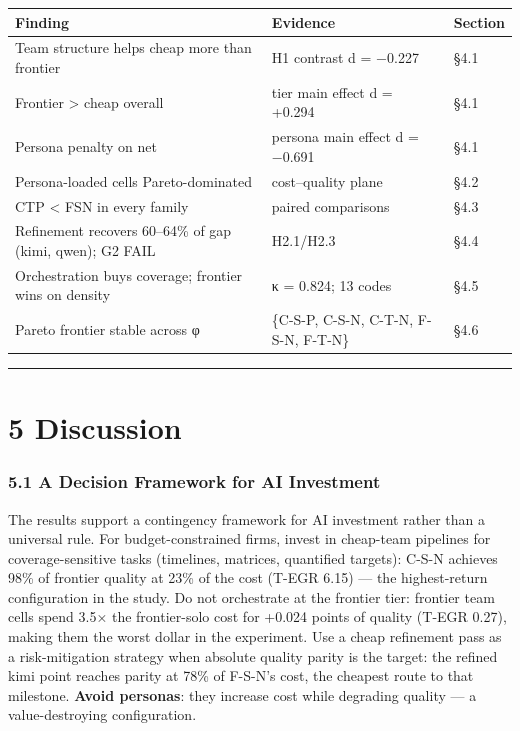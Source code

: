 \documentclass[11pt,a4paper]{article}
\begin{document}
\begin{table}[htbp]
\centering
\begin{tabular}{lll}
\toprule
Finding & Evidence & Section \\
\midrule
Team structure helps cheap more than frontier & H1 contrast d = −0.227 & §4.1 \\
Frontier > cheap overall & tier main effect d = +0.294 & §4.1 \\
Persona penalty on net & persona main effect d = −0.691 & §4.1 \\
Persona-loaded cells Pareto-dominated & cost–quality plane & §4.2 \\
CTP < FSN in every family & paired comparisons & §4.3 \\
Refinement recovers 60–64\% of gap (kimi, qwen); G2 FAIL & H2.1/H2.3 & §4.4 \\
Orchestration buys coverage; frontier wins on density & κ = 0.824; 13 codes & §4.5 \\
Pareto frontier stable across φ & \{C-S-P, C-S-N, C-T-N, F-S-N, F-T-N\} & §4.6 \\
\bottomrule
\end{tabular}
\end{table}


\hrule


\section{5 Discussion}

\subsubsection{5.1 A Decision Framework for AI Investment}

The results support a contingency framework for AI investment rather
than a universal rule. For budget-constrained firms, \textit{}invest in cheap-team
pipelines for coverage-sensitive tasks\textit{} (timelines, matrices, quantified
targets): C-S-N achieves 98\% of frontier quality at 23\% of the cost
(T-EGR 6.15) — the highest-return configuration in the study. \textit{}Do not
orchestrate at the frontier tier\textit{}: frontier team cells spend 3.5× the
frontier-solo cost for +0.024 points of quality (T-EGR 0.27), making them
the worst dollar in the experiment. \textit{}Use a cheap refinement pass as a
risk-mitigation strategy\textit{} when absolute quality parity is the target:
the refined kimi point reaches parity at 78\% of F-S-N's cost, the cheapest
route to that milestone. \textbf{Avoid personas}: they increase cost while
degrading quality — a value-destroying configuration.
\end{document}
